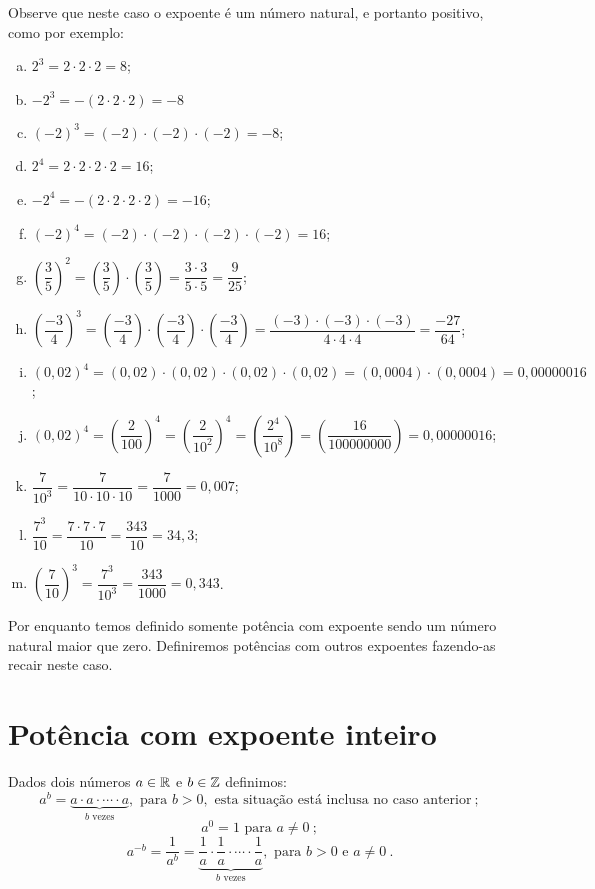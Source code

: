  \begin{exem}
 Observe que neste caso o expoente é um número natural, e portanto positivo, como por exemplo:

 \begin{enumerate}[a)]
  \item $2^3= 2 \cdot 2 \cdot 2= 8$;
  \item $-2^3= -(2 \cdot 2 \cdot 2)= -8$
  \item $(-2)^3= (-2) \cdot (-2) \cdot (-2)= -8$;
  \item $2^4=2 \cdot 2 \cdot 2 \cdot  2= 16$;
  \item $-2^4= -(2 \cdot 2 \cdot 2 \cdot 2)= -16$;
  \item $(-2)^4= (-2) \cdot (-2) \cdot (-2) \cdot (-2)= 16$;
  \item $\left(\dfrac{3}{5}\right)^2= \left(\dfrac{3}{5}\right) \cdot \left(\dfrac{3}{5}\right)= \dfrac{3 \cdot 3}{5 \cdot 5}= \dfrac{9}{25}$;
  \item $\left(\dfrac{-3}{4}\right)^3= \left(\dfrac{-3}{4}\right) \cdot \left(\dfrac{-3}{4}\right) \cdot \left(\dfrac{-3}{4}\right)= \dfrac{(-3) \cdot (-3) \cdot (-3)}{4 \cdot 4 \cdot 4}= \dfrac{-27}{64}$;
  \item $(0,02)^4= (0,02) \cdot (0,02) \cdot (0,02) \cdot (0,02)= (0,0004) \cdot (0,0004)= 0,00000016$;
  \item $(0,02)^4= \left(\dfrac{2}{100}\right)^4= \left(\dfrac{2}{10^2}\right)^4= \left(\dfrac{2^4}{10^8}\right)= \left(\dfrac{16}{100000000}\right)= 0,00000016$;
  \item $\dfrac{7}{10^3}= \dfrac{7}{10 \cdot 10 \cdot 10}= \dfrac{7}{1000}= 0,007$;
  \item $\dfrac{7^3}{10}=  \dfrac{7 \cdot 7 \cdot 7}{10}= \dfrac{343}{10}=34,3$;
  \item $\left(\dfrac{7}{10}\right)^3= \dfrac{7^3}{10^3}= \dfrac{343}{1000}= 0,343$.
  \end{enumerate}

 \end{exem}

 Por enquanto temos definido somente potência com expoente sendo um número natural maior que zero. Definiremos potências com outros expoentes fazendo-as recair neste caso.

 \section{Potência com expoente inteiro}
 \vskip0.3cm

 \colorbox{azul}{
 \begin{minipage}{0.9\linewidth}
 \begin{center}
   Dados dois números $a \in \mathbb{R}$ e $b \in \mathbb{Z}$ definimos:
 \[a^b= \underbrace{a \cdot a \cdot \cdots \cdot a}_{b \text{ vezes}}, \text{ para } b > 0, \text{ esta situação está inclusa no caso anterior} \ ;\]
 \[a^{0}= 1 \text{ para } a \neq 0 \ ;\]
 \[a^{-b}= \dfrac{1}{a^b}= \underbrace{\dfrac{1}{a} \cdot \dfrac{1}{a} \cdot \cdots \cdot \dfrac{1}{a}}_{b \text{ vezes}}, \text{ para } b>0 \text{ e } a \neq 0 \ .\]
 \end{center}
 \end{minipage}}

